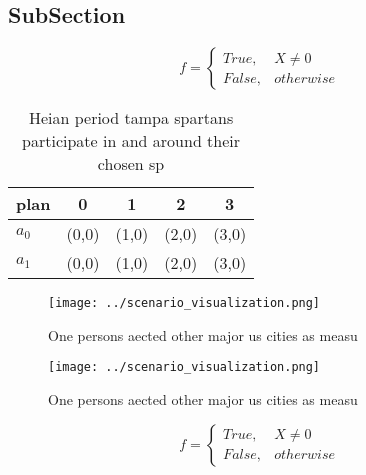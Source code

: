 \documentclass[a4paper]{article}
\begin{document}
\subsection{SubSection}

\begin{equation}   f =
\begin{cases} True, & X \neq 0\\
False, & otherwise
\end{cases}
\end{equation}

\begin{table}
\begin{adjustbox}{width=0.5\columnwidth}
\begin{tabular}{|l|l|l|l|l|}
\hline
\textbf{plan} & \multicolumn{1}{c|}{\textbf{0}} & \multicolumn{1}{c|}{\textbf{1}} & \multicolumn{1}{c|}{\textbf{2}} & \multicolumn{1}{c|}{\textbf{3}} \\ \hline
\textbf{$a_0$}  & (0,0) & (1,0) & (2,0) & (3,0) \\ \hline
\textbf{$a_1$}  & (0,0) & (1,0) & (2,0) & (3,0) \\ \hline
\end{tabular}
\end{adjustbox}
\caption{Heian period tampa spartans participate in and around their chosen sp
}
\end{table}

\begin{figure}
\centering
\texttt{[image: ../scenario\_visualization.png]}
\caption{One persons aected other major us cities as measu
}
\end{figure}
 
\begin{figure}
\centering
\texttt{[image: ../scenario\_visualization.png]}
\caption{One persons aected other major us cities as measu
}
\end{figure}
 
\begin{equation}   f =
\begin{cases} True, & X \neq 0\\
False, & otherwise
\end{cases}
\end{equation}
\end{document}
